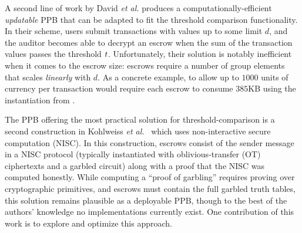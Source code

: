 A second line of work by David \emph{et al.} \cite{AC:DEFKPV24} produces a computationally-efficient \emph{updatable} PPB that can be adapted to fit the threshold comparison functionality.
In their scheme, users submit transactions with values up to some limit $d$, and the auditor becomes able to decrypt an escrow when the sum of the transaction values passes the threshold $t$.
Unfortunately, their solution is notably inefficient when it comes to the escrow size: escrows require a number of group elements that scales \emph{linearly} with $d$.
As a concrete example, to allow up to $1000$ units of currency per transaction would require each escrow to consume $385$KB using the instantiation from \cite[\S8]{AC:DEFKPV24}.

The PPB offering the most practical solution for threshold-comparison is a second construction in Kohlweiss \emph{et al.}~\cite{EC:KohLysNgu23} which uses non-interactive secure computation (NISC).
In this construction, escrows consist of the sender message in a NISC protocol (typically instantiated with oblivious-transfer (OT) ciphertexts and a garbled circuit) along with a proof that the NISC was computed honestly.
While computing a ``proof of garbling'' requires proving over cryptographic primitives, and escrows must contain the full garbled truth tables, this solution remains plausible as a deployable PPB, though to the best of the authors' knowledge no implementations currently exist.
One contribution of this work is to explore and optimize this approach.

